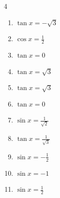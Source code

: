 \begin{multicols}{4}
\begin{enumerate}

  \item $\displaystyle \tan{x}  = -\sqrt{3}$


  \item $\displaystyle \cos{x}  = \frac{1}{2}$


  \item $\displaystyle \tan{x}  = 0$

        \phantom{$\displaystyle x = 0 , \pi$}

  \item $\displaystyle \tan{x}  = \sqrt{3}$


  \item $\displaystyle \tan{x}  = \sqrt{3}$


  \item $\displaystyle \tan{x}  = 0$

        \phantom{$\displaystyle x = 0 , \pi$}

  \item $\displaystyle \sin{x}  = \frac{1}{\sqrt{2}}$


  \item $\displaystyle \tan{x}  = \frac{1}{\sqrt{3}}$


  \item $\displaystyle \sin{x}  = -\frac{1}{2}$


  \item $\displaystyle \sin{x}  = -1$


  \item $\displaystyle \sin{x}  = \frac{1}{2}$



\end{enumerate}
\end{multicols}
